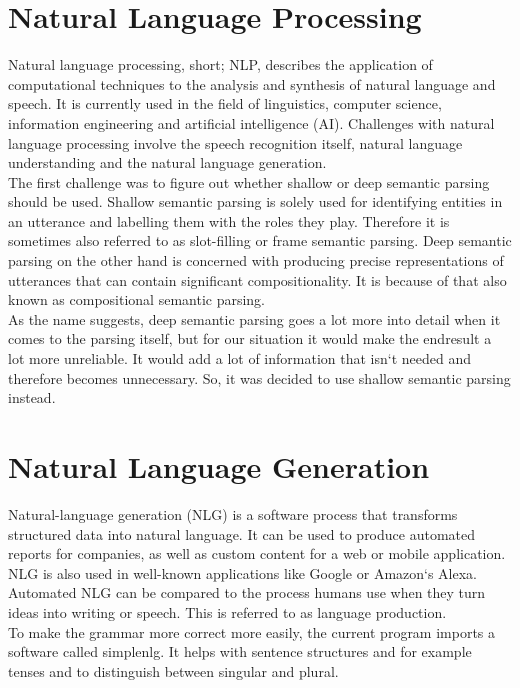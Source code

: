 \documentclass[main.tex]{subfiles}
\begin{document}
	 \section{Natural Language Processing}
	Natural language processing, short; NLP, describes the application of computational techniques to the analysis and synthesis of natural language and speech. It is currently used in the field of linguistics, computer science, information engineering and artificial intelligence (AI). Challenges with natural language processing involve the speech recognition itself, natural language understanding and the natural language generation.\\ 
	The first challenge was to figure out whether shallow or deep semantic parsing should be used. Shallow semantic parsing is solely used for identifying entities in an utterance and labelling them with the roles they play. Therefore it is sometimes also referred to as slot-filling or frame semantic parsing. Deep semantic parsing on the other hand is concerned with producing precise representations of utterances that can contain significant compositionality. It is because of that also known as compositional semantic parsing.\\ 
	As the name suggests, deep semantic parsing goes a lot more into detail when it comes to the parsing itself, but for our situation it would make the endresult a lot more unreliable. It would add a lot of information that isn‘t needed and therefore becomes unnecessary. So, it was decided to use shallow semantic parsing instead.

	\section{Natural Language Generation}
	Natural-language generation (NLG) is a software process that transforms structured data into natural language. It can be used to produce automated reports for companies, as well as custom content for a web or mobile application. NLG is also used in well-known applications like Google or Amazon‘s Alexa.\\
	Automated NLG can be compared to the process humans use when they turn ideas into writing or speech. This is referred to as language production.\\
	To make the grammar more correct more easily, the current program imports a software called simplenlg. It helps with sentence structures and for example tenses and to distinguish between singular and plural.\\
\end{document}
